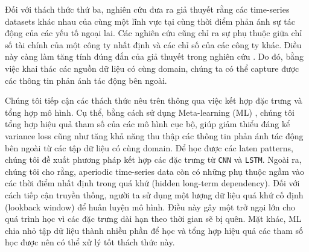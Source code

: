 \documentclass[aps,prb,groupedaddress,twocolumn,showpacs,dvipdfmx,superscriptaddress,pdftex]{revtex4-2}
\begin{document}

\vspace{2mm}

Đối với thách thức thứ ba, nghiên cứu \cite{fama1970efficient} đưa ra giả thuyết rằng các time-series datasets khác nhau của cùng một lĩnh vực tại cùng thời điểm phản ánh sự tác động của các yếu tố ngoại lai. Các nghiên cứu \citep{overreactioncontrarian, mech1993portfolio} cũng chỉ ra sự phụ thuộc giữa chỉ số tài chính của một công ty nhất định và các chỉ số của các công ty khác. Điều này càng làm tăng tính đúng đắn của giả thuyết trong nghiên cứu \cite{fama1970efficient}. Do đó, bằng việc khai thác các nguồn dữ liệu có cùng domain, chúng ta có thể capture được các thông tin phản ánh tác động bên ngoài.


\vspace{2mm}

Chúng tôi tiếp cận các thách thức nêu trên thông qua việc kết hợp đặc trưng và tổng hợp mô hình. Cụ thể, bằng cách sử dụng Meta-learning (ML) \cite{finn2017model}, chúng tôi tổng hợp hiệu quả tham số của các mô hình cục bộ, giúp giảm thiểu đáng kể variance loss cũng như tăng khả năng thu thập các thông tin phản ánh tác động bên ngoài từ các tập dữ liệu có cùng domain. Để học được các laten patterns, chúng tôi đề xuất phương pháp kết hợp các đặc trưng từ \verb|CNN| và \verb|LSTM|. Ngoài ra, chúng tôi cho rằng, aperiodic time-series data còn có những phụ thuộc ngầm vào các thời điểm nhất định trong quá khứ (hidden long-term dependency). Đối với cách tiếp cận truyền thống, người ta sử dụng một lượng dữ liệu quá khứ cố định (lookback window) để huấn luyện mô hình. Điều này gây một trở ngại lớn cho quá trình học vì các đặc trưng dài hạn theo thời gian sẽ bị quên. Mặt khác, ML chia nhỏ tập dữ liệu thành nhiều phần để học và tổng hợp hiệu quả các tham số học được nên có thể xử lý tốt thách thức này.
\end{document}
